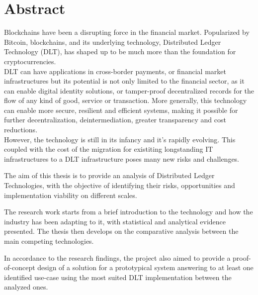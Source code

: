 
\newpage

\mbox{}\vfill
\chapter*{\centering Abstract}

Blockchains have been a disrupting force in the financial market. Popularized by Bitcoin, blockchains, and its underlying technology, Distributed Ledger Technology (DLT), has shaped up to be much more than the foundation for cryptocurrencies.\\

DLT can have applications in cross-border payments, or financial market infrastructures but its potential is not only limited to the financial sector, as it can enable digital identity solutions, or tamper-proof decentralized records for the flow of any kind of good, service or transaction.
More generally, this technology can enable more secure, resilient and efficient systems, making it possible for further decentralization, deintermediation, greater transparency and cost reductions.\\

However, the technology is still in its infancy and it's rapidly evolving. This coupled with the cost of the migration for existiting longstanding IT infrastructures to a DLT infrastructure poses many new risks and challenges.

The aim of this thesis is to provide an analysis of Distributed Ledger Technologies, with the objective of identifying their risks, opportunities and implementation viability on different scales. 

The research work starts from a brief introduction to the technology and how the industry has been adapting to it, with statistical and analytical evidence presented. The thesis then develops on the comparative analysis between the main competing technologies.

In accordance to the research findings, the project also aimed to provide a proof-of-concept design of a solution for a prototypical system answering to at least one identified use-case using the most suited DLT implementation between the analyzed ones.

\mbox{}\vfill

